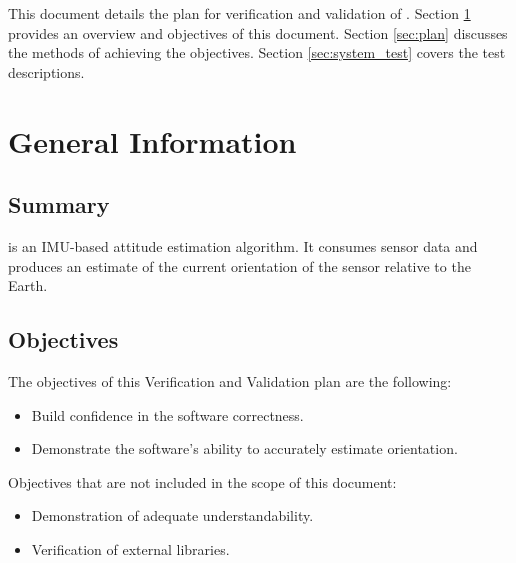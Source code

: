 \documentclass[12pt, titlepage]{article}
\begin{document}
This document details the plan for verification and validation of \progname{}. Section
\ref{sec:general} provides an overview and objectives of this document. Section \ref{sec:plan}
discusses the methods of achieving the objectives. Section \ref{sec:system_test} covers the test
descriptions.


\section{General Information} \label{sec:general}

\subsection{Summary}

\progname{} is an IMU-based attitude estimation algorithm. It consumes sensor data and produces an
estimate of the current orientation of the sensor relative to the Earth.


\subsection{Objectives}

The objectives of this Verification and Validation plan are the following:

\begin{itemize}
    \item Build confidence in the software correctness.
    \item Demonstrate the software's ability to accurately estimate orientation.
\end{itemize}


\noindent
Objectives that are not included in the scope of this document:

\begin{itemize}
    \item Demonstration of adequate understandability.
    \item Verification of external libraries.
\end{itemize}
\end{document}
